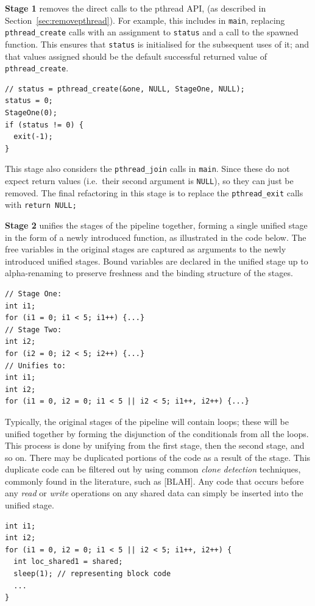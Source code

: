 \textbf{Stage 1} removes the direct calls to the pthread API, (as described in Section~\ref{sec:removepthread}). For example, this includes in \lstinline|main|, replacing \lstinline|pthread_create| calls with an assignment to \lstinline|status| and a call to the spawned function. This ensures that \lstinline|status| is initialised for the subsequent uses of it; and that values assigned should be the default successful returned value of \lstinline|pthread_create|.
\begin{lstlisting}[frame=single]
// status = pthread_create(&one, NULL, StageOne, NULL);
status = 0;
StageOne(0);
if (status != 0) {
  exit(-1);
}
\end{lstlisting}

This stage also considers the \lstinline|pthread_join| calls in \lstinline|main|. Since these do not expect return values (i.e.\ their second argument is \lstinline|NULL|), so they can just be removed.
The final refactoring in this stage is to replace the \lstinline|pthread_exit| calls with \lstinline|return NULL;|

\textbf{Stage 2} unifies the stages of the pipeline together, forming a single unified stage in the form of a newly introduced function, as illustrated in the code below. The free variables in the original stages are captured as arguments to the newly introduced unified stages. Bound variables are declared in the unified stage up to alpha-renaming to preserve freshness and the binding structure of the stages. 

  \begin{lstlisting}[frame=single]
// Stage One:
int i1;
for (i1 = 0; i1 < 5; i1++) {...}
// Stage Two:
int i2;
for (i2 = 0; i2 < 5; i2++) {...}
// Unifies to:
int i1;
int i2;
for (i1 = 0, i2 = 0; i1 < 5 || i2 < 5; i1++, i2++) {...}
\end{lstlisting}

Typically, the original stages of the pipeline will contain loops; these will be unified together by forming the disjunction of the conditionals from all the loops.
 This process is done by unifying from the first stage, then the second stage, and so on. There may be duplicated portions of the code as a result of the stage. This duplicate code can be filtered out by using common \emph{clone detection} techniques, commonly found in the literature, such as [BLAH]. Any code that occurs before any \emph{read} or \emph{write} operations on any shared data can simply be inserted into the unified stage. 
 
\begin{lstlisting}[frame=single]
int i1;
int i2;
for (i1 = 0, i2 = 0; i1 < 5 || i2 < 5; i1++, i2++) {
  int loc_shared1 = shared;
  sleep(1); // representing block code
  ...
}
\end{lstlisting}

